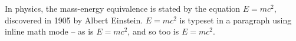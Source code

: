 \documentclass[12pt, letterpaper]{article}
\begin{document}
In physics, the mass-energy equivalence is stated by the equation $E=mc^2$, discovered in 1905 by Albert Einstein.
\begin{math} E=mc^2 \end{math} is typeset in a paragraph using inline math mode -- as is $E=mc^2$, and so too is \(E=mc^2\).
\end{document}
